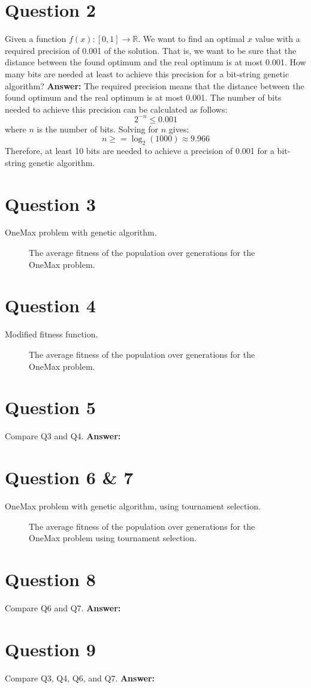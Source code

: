 \documentclass[12pt,letterpaper]{article}
\newcommand{\xAns}{\vskip 2mm\textbf{Answer:} }
\begin{document}
\section*{Question 2}
Given a function $f(x) : [0,1] \rightarrow \mathbb{R}$. We want to find an optimal $x$
value with a required precision of 0.001 of the solution. That is, we
want to be sure that the distance between the found optimum and the
real optimum is at most 0.001. How many bits are needed at least to
achieve this precision for a bit-string genetic algorithm?
\xAns The required precision means that the distance between the found optimum and the real optimum is at most 0.001. The number of bits needed to achieve this precision can be calculated as follows:
\begin{equation}
    2^{-n} \leq 0.001
\end{equation}
where $n$ is the number of bits. Solving for $n$ gives:
\begin{equation}
    n \geq = \log_2(1000) \approx 9.966
\end{equation}
Therefore, at least 10 bits are needed to achieve a precision of 0.001 for a bit-string genetic algorithm.
\section*{Question 3}
OneMax problem with genetic algorithm.
\begin{figure}
    \centering
    \caption{The average fitness of the population over generations for the OneMax problem.}
    \label{fig:3a}
\end{figure}

\section*{Question 4}
Modified fitness function.
\begin{figure}
    \centering
    \caption{The average fitness of the population over generations for the OneMax problem.}
    \label{fig:4a}
\end{figure}

\section*{Question 5}
Compare Q3 and Q4. \xAns

\section*{Question 6 \& 7}
OneMax problem with genetic algorithm, using tournament selection.
\begin{figure}
    \centering
    \caption{The average fitness of the population over generations for the OneMax problem using tournament selection.}
    \label{fig:6a}
\end{figure}

\section*{Question 8}
Compare Q6 and Q7. \xAns

\section*{Question 9}
Compare Q3, Q4, Q6, and Q7. \xAns
\end{document}
